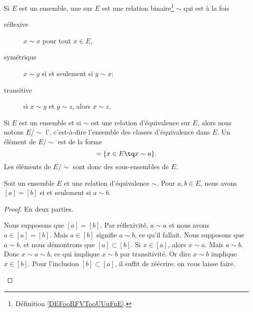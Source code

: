 \begin{definition}  \label{DefHoJzMp}
	Si \( E\) est un ensemble, une  sur \( E\) est une relation binaire\footnote{Définition \ref{DEFooRFVTooUUuFuE}.} \( \sim\) qui est à la fois
	\begin{description}
		\item[réflexive]  \( x\sim x\) pour tout \( x\in E\),
		\item[symétrique] \( x\sim y\) si et seulement si \( y\sim x\);
		\item[transitive] si \( x\sim y\) et \( y\sim z\), alors \( x\sim z\).
	\end{description}
\end{definition}

\begin{definition}      \label{DEFooRHPSooHKBZXl}
	Si \( E\) est un ensemble et si \( \sim\) est une relation d'équivalence sur \( E\), alors nous notons \( E/\sim\) l', c'est-à-dire l'ensemble des classes d'équivalence dans \( E\). Un élément de \( E/\sim\) est de la forme
	\begin{equation}
		[a]=\{ x\in E\tq x\sim a \}.
	\end{equation}
	Les éléments de \( E/\sim\) sont donc des sous-ensembles de \( E \).
\end{definition}

\begin{lemma}		\label{LEMooEgaliteClassesGen}
	Soit un ensemble \( E\) et une relation d'équivalence \( \sim\). Pour \( a,b\in E\), nous avons \( [a]=[b]\) si et seulement si \( a\sim b\).
\end{lemma}

\begin{proof}
	En deux parties.
	\begin{subproof}
		\spitem[\( \Rightarrow\)]
		Nous supposons que \( [a]=[b]\). Par réflexivité, \( a\sim a\) et nous avons \( a\in [a]=[b]\). Mais \( a\in [b]\) signifie \( a\sim b\), ce qu'il fallait.
		\spitem[\( \Leftarrow\)]
		Nous supposons que \( a\sim b\), et nous démontrons que \( [a]\subset [b]\). Si \( x\in [a]\), alors \( x\sim a\). Mais \( a\sim b\). Donc \( x\sim a\sim b\), ce qui implique \( x\sim b\) par transitivité. Or dire \( x\sim b\) implique \( x\in [b]\). Pour l'inclusion \( [b]\subset [a]\), il suffit de réécrire: on vous laisse faire.
	\end{subproof}
\end{proof}

